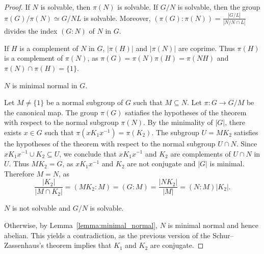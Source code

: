 \begin{proof}
	If $N$ is solvable, then $\pi(N)$ is solvable. If $G/N$ is solvable, then the group 
	$\pi(G)/\pi(N)\simeq G/NL$ is solvable. Moreover, 
	$(\pi(G):\pi(N))=\frac{|G/L|}{|N/N\cap L|}$ divides the index $(G:N)$ of $N$ in $G$. 
	
	If $H$ is a complement of $N$ in $G$, $|\pi(H)|$ and $|\pi(N)|$ are coprime.
	Thus $\pi(H)$ is a complement of $\pi(N)$, as 
	$\pi(G)=\pi(N)\pi(H)=\pi(NH)$ and 
	$\pi(N)\cap\pi(H)=\{1\}$. 

	\begin{claim}
		$N$ is minimal normal in $G$.
	\end{claim}

	Let $M\ne\{1\}$ be a normal subgroup of $G$ such that $M\subseteq N$. Let $\pi\colon G\to G/M$
	be the canonical map. The group $\pi(G)$ satiafies the hypotheses of the theorem
	with respect to the normal subgroup $\pi(N)$. By the minimality of $|G|$, there exists 
	$x\in G$ such that $\pi(xK_1x^{-1})=\pi(K_2)$. The subgroup 
	$U=MK_2$ satisfies the hypotheses of the theorem with respect to the normal subgroup 
	$U\cap N$. Since $xK_1x^{-1}\cup K_2\subseteq U$,
	we conclude that $xK_1x^{-1}$ and $K_2$ are complements of $U\cap N$ in $U$.
	Thus $MK_2=G$, as $xK_1x^{-1}$ and $K_2$ are not conjugate and $|G|$ is minimal. 
	Therefore $M=N$, as  
	\[
		\frac{|K_2|}{|M\cap K_2|}=(MK_2:M)=(G:M)=\frac{|NK_2|}{|M|}=(N:M)|K_2|.
	\]

	\begin{claim}
		$N$ is not solvable and $G/N$ is solvable. 
	\end{claim}
	
	Otherwise, by Lemma~\ref{lemma:minimal_normal}, 	$N$ is minimal normal
	and hence abelian. This yields a contradiction, as 
	the previous version of the Schur--Zassenhaus's theorem implies that
	$K_1$ and $K_2$ are conjugate. 
	

\end{proof}
